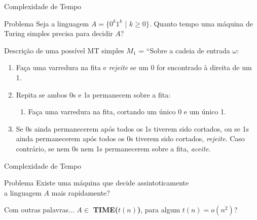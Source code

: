 \documentclass[xcolor=dvipsnames,table]{beamer}
\begin{document}
	\begin{frame}[shrink]{Complexidade de Tempo}
		\begin{block}{Problema}
			Seja a linguagem $A = \{ 0^k 1^k$ | $k \geq 0 \}$. Quanto tempo uma máquina de Turing simples precisa para decidir $A$?
		\end{block} 
		\begin{block}{Descrição de uma possível MT simples}
			$M_1$ = ``Sobre a cadeia de entrada $\omega$:
			\begin{enumerate}
				\item Faça uma varredura na fita e {\it rejeite} se um 0 for encontrado à direita de um 1.
				\item Repita se ambos 0s e 1s permanecem sobre a fita:
				\begin{enumerate}
					\item Faça uma varredura na fita, cortando um único 0 e um único 1.
				\end{enumerate}
				\item Se 0s ainda permanecerem após todos os 1s tiverem sido cortados, ou se 1s ainda permanecerem após todos os 0s tiverem sido cortados, {\it rejeite}. Caso contrário, se nem 0s nem 1s permanecerem sobre a fita, {\it aceite}.
			\end{enumerate}
		\end{block}
	\end{frame}
	
	\begin{frame}{Complexidade de Tempo}
		\begin{block}{Problema}
			Existe uma máquina que decide assintoticamente \\a linguagem $A$ mais rapidamente?
		\end{block}   
		\begin{block}{Com outras palavras...}
			$A \in$ {\bf TIME($t(n)$)}, para algum $t(n) = o(n^2)$?
		\end{block}
	\end{frame}
	
\end{document}
